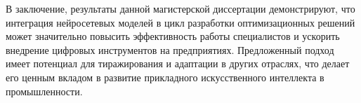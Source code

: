 В заключение, результаты данной магистерской диссертации демонстрируют, что интеграция нейросетевых моделей в цикл разработки оптимизационных решений может значительно повысить эффективность работы специалистов и ускорить внедрение цифровых инструментов на предприятиях. Предложенный подход имеет потенциал для тиражирования и адаптации в других отраслях, что делает его ценным вкладом в развитие прикладного искусственного интеллекта в промышленности.
